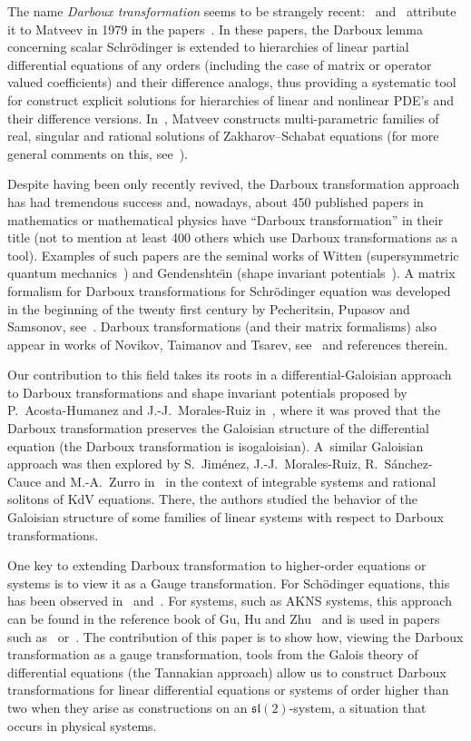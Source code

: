 \documentclass[pdftex]{sigma}%
\numberwithin{equation}{section}
\begin{document}
The name \emph{Darboux transformation} seems to be strangely recent:~\cite{rosu1999short} and~\cite{GHZ} attribute it to Matveev in 1979 in the papers~\cite{Ma79u,Ma79m,MaSa79a}.
In these papers, the Darboux lemma concerning scalar Schr\"odinger
is extended to hierarchies
of linear partial differential equations of any orders (including the case of matrix or operator valued coefficients)
and their difference analogs, thus providing a systematic tool for construct explicit solutions
for hierarchies of linear and nonlinear PDE's and their difference versions.
In~\cite{Ma79a}, Matveev constructs multi-parametric families of real, singular and rational solutions of Zakharov--Schabat equations (for more general comments on this, see~\cite{Ma00a}).


Despite having been only recently revived, the Darboux transformation approach has had tremendous success and, nowadays, about 450 published papers in mathematics or mathematical physics have ``Darboux transformation'' in their title (not to mention at least 400 others which use Darboux transformations as a tool). Examples of such papers are the seminal works of Witten (supersymmetric quantum mechanics~\cite{wi}) and Gendenshte\"{\i}n (shape invariant potentials~\cite{ge}).
A matrix formalism for Darboux transformations for Schr\"odinger
equation was developed in the beginning of the twenty first century by Pecheritsin, Pupasov and Samsonov, see~\cite{sape}. Darboux transformations (and their matrix formalisms) also appear
in works of Novikov, Taimanov and Tsarev, see~\cite{NoTa16b,NoTa18v} and references therein.

Our contribution to this field takes its roots in a differential-Galoisian approach to Darboux transformations and shape
invariant potentials proposed by P.~Acosta-Humanez and \mbox{J.-J.~Morales}-Ruiz in~\cite{AP2,ac2,AP1}, where it was proved that the Darboux transformation
preserves the Galoisian structure of the differential equation (the Darboux transformation is isogaloisian). A~similar Galoisian approach was then explored by S.~Jim\'enez, \mbox{J.-J.~Morales}-Ruiz, R.~S\'anchez-Cauce and M.-A.~Zurro in~\cite{JiMoSaZu17r,JiMoSaZu18v,JiMoSaZu19f} in the context of integrable systems and rational solitons of KdV equations.
There, the authors studied the behavior of the Galoisian structure of some families of linear systems with respect to Darboux transformations.

One key to extending Darboux transformation to higher-order equations or systems is to view it as a Gauge transformation. For Sch\"odinger equations, this has been observed in~\cite{AP1} and~\cite{AP2,ac2}. For systems, such as AKNS systems, this approach can be found in the reference book of Gu, Hu and Zhu~\cite[Section~1.3, p.~18]{GHZ} and is used in papers such as~\cite{YaRu13m} or~\cite{JiMoSaZu17r,JiMoSaZu18v,JiMoSaZu19f}.
The contribution of this paper is to show how, viewing the Darboux transformation as a gauge transformation, tools from the Galois theory of differential equations (the Tannakian approach) allow us to construct Darboux transformations for linear differential equations or systems of order higher than two when they arise as constructions on an $\mathfrak{sl}(2)$-system, a situation that occurs in physical systems.
\end{document}
